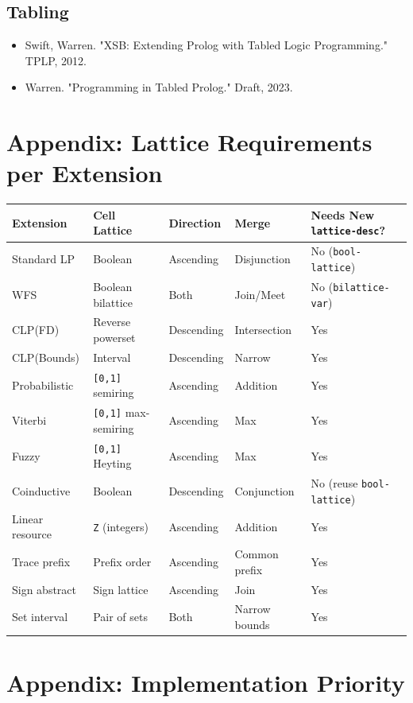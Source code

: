 \documentclass[11pt]{article}
\begin{document}
\subsection{Tabling}
\label{sec:orgccec5d4}
\begin{itemize}
\item Swift, Warren. "XSB: Extending Prolog with Tabled Logic Programming." TPLP, 2012.
\item Warren. "Programming in Tabled Prolog." Draft, 2023.
\end{itemize}
\section{Appendix: Lattice Requirements per Extension}
\label{sec:org937b7d0}

\begin{center}
\begin{tabular}{lllll}
Extension & Cell Lattice & Direction & Merge & Needs New \texttt{lattice-desc}?\\
\hline
Standard LP & Boolean & Ascending & Disjunction & No (\texttt{bool-lattice})\\
WFS & Boolean bilattice & Both & Join/Meet & No (\texttt{bilattice-var})\\
CLP(FD) & Reverse powerset & Descending & Intersection & Yes\\
CLP(Bounds) & Interval & Descending & Narrow & Yes\\
Probabilistic & \texttt{[0,1]} semiring & Ascending & Addition & Yes\\
Viterbi & \texttt{[0,1]} max-semiring & Ascending & Max & Yes\\
Fuzzy & \texttt{[0,1]} Heyting & Ascending & Max & Yes\\
Coinductive & Boolean & Descending & Conjunction & No (reuse \texttt{bool-lattice})\\
Linear resource & \texttt{Z} (integers) & Ascending & Addition & Yes\\
Trace prefix & Prefix order & Ascending & Common prefix & Yes\\
Sign abstract & Sign lattice & Ascending & Join & Yes\\
Set interval & Pair of sets & Both & Narrow bounds & Yes\\
\end{tabular}
\end{center}
\section{Appendix: Implementation Priority}
\label{sec:orgfbb5f69}
\end{document}
